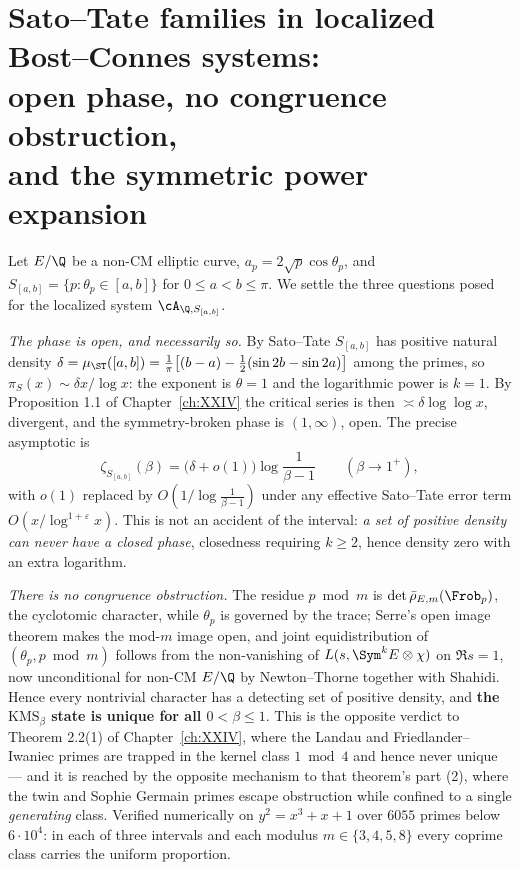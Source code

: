 \chapter[Sato--Tate families]{Sato--Tate families in localized Bost--Connes systems:\\ open phase, no congruence obstruction,\\ and the symmetric power expansion}\label{ch:XXV}
\renewcommand{\Tr}{\operatorname{tr}}
\begin{summary}
Let $E/\Q$ be a non-CM elliptic curve, $a_p=2\sqrt p\cos\theta_p$, and
$S_{[a,b]}=\{p:\theta_p\in[a,b]\}$ for $0\le a<b\le\pi$. We settle the three questions posed
for the localized system $\cA_{\Q,S_{[a,b]}}$.

\emph{The phase is open, and necessarily so.} By Sato--Tate $S_{[a,b]}$ has positive natural
density $\delta=\mu_\ST([a,b])=\frac1\pi\bigl[(b-a)-\tfrac12(\sin2b-\sin2a)\bigr]$ among the
primes, so $\pi_S(x)\sim\delta x/\log x$: the exponent is $\theta=1$ and the logarithmic power
is $k=1$. By Proposition 1.1 of Chapter~\ref{ch:XXIV} the critical series is then
$\asymp\delta\log\log x$, divergent, and the symmetry-broken phase is $(1,\infty)$, open. The
precise asymptotic is
\[
\zeta_{S_{[a,b]}}(\beta)=\bigl(\delta+o(1)\bigr)\log\frac{1}{\beta-1}\qquad(\beta\to1^+),
\]
with $o(1)$ replaced by $O(1/\log\frac{1}{\beta-1})$ under any effective Sato--Tate error
term $O(x/\log^{1+\varepsilon}x)$.
This is not an accident of the interval: \emph{a set of positive density can never have a
closed phase}, closedness requiring $k\ge2$, hence density zero with an extra logarithm.

\emph{There is no congruence obstruction.} The residue $p\bmod m$ is
$\det\bar\rho_{E,m}(\Frob_p)$, the cyclotomic character, while $\theta_p$ is governed by the
trace; Serre's open image theorem makes the mod-$m$ image open, and joint equidistribution of
$(\theta_p,p\bmod m)$ follows from the non-vanishing of $L(s,\Sym^kE\otimes\chi)$ on
$\Re s=1$, now unconditional for non-CM $E/\Q$ by Newton--Thorne together with Shahidi.
Hence every nontrivial character has a detecting set of positive density, and
\textbf{the $\mathrm{KMS}_\beta$ state is unique for all $0<\beta\le1$}. This is the
opposite verdict to Theorem 2.2(1) of Chapter~\ref{ch:XXIV}, where the Landau and
Friedlander--Iwaniec primes are trapped in the kernel class $1\bmod4$ and hence
never unique --- and it is reached by the opposite mechanism to that theorem's part (2),
where the twin and Sophie Germain primes escape obstruction while confined to a single
\emph{generating} class. Verified numerically on $y^2=x^3+x+1$ over $6055$ primes below $6\cdot10^4$:
in each of three intervals and each modulus $m\in\{3,4,5,8\}$ every coprime class carries the
uniform proportion.


\end{summary}
